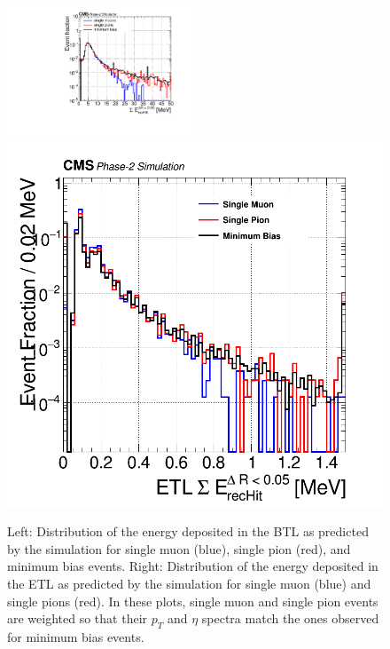 \begin{figure}[hbtp]
\centering
\includegraphics[width=0.49\textwidth]{fig/performance/c_all_Edep.pdf}
\includegraphics[width=0.45\linewidth]{fig/performance/h_3_recHit_energy_dR05_withTrackETL_20keVbins.png}
\caption{Left: Distribution of the energy deposited in the BTL as predicted by the simulation for single muon (blue), single pion (red), and minimum bias events. 
Right: Distribution of the energy deposited in the ETL as predicted by the simulation for single muon (blue) and single pions (red). 
In these plots, single muon and single pion events are weighted so that their $p_{T}$ and $\eta$ spectra match the ones observed for minimum bias events. 
}
\label{fig:BTL_Edep}
\end{figure}

